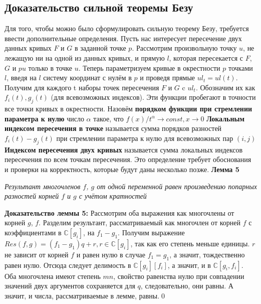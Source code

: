 \documentclass[a4paper, 12pt]{article}
\begin{document}
\pagebreak
\subsection{Доказательство сильной теоремы Безу}
Для того, чтобы можно было сформулировать сильную теорему Безу, требуется ввести дополнительные определения.\newline
Пусть нас интересует пересечение двух данных кривых $F$ и $G$ в заданной точке $p$. Рассмотрим произвольную точку $u$, не лежащую ни на одной из данных кривых, и прямую $l$, которая пересекается с $F$, $G$ и $pu$ только в точке $u$. Теперь параметризуем кривые в окрестности $p$ точками $l$, введя на $l$ систему координат с нулём в $p$ и проведя прямые $ul_t=ul(t)$. Получим для каждого t наборы точек пересечения $F$ и $G$ c $ul_t$. Обозначим их как $f_i(t), g_j(t)$ (для всевозможных индексов). Эти функции пробегают в точности все точки кривых в окрестности. \newline %
Назовём \textbf{порядком функции при стремлении параметра к нулю} число $\alpha$ такое, что $f(x)/t^\alpha \rightarrow const, x \rightarrow 0$\newline
\textbf{Локальным индексом пересечения в точке} называется сумма порядков разностей $f_i(t) - g_j(t)$ при стремлении параметра к нулю для всевозможных пар $(i,j)$\newline
\textbf{Индексом пересечения двух кривых} называется сумма локальных индексов пересечения по всем точкам пересечения.
\bigskip
Это определение требует обоснования и проверки на корректность, которые будут даны несколько позже.
\bigskip
\textbf{Лемма 5}

\textit{Результант многочленов $f$, $g$ от одной переменной равен произведению попарных разностей корней $f$ и $g$ с учётом кратностей}\newline

\textbf{Доказательство леммы 5:}\newline
Рассмотрим оба выражения как многочлены от корней $g$, $f$.\newline 
Разделим результант, рассматриваемый как многочлен от корней $f$ с коэффициентами в $\mathbb{C}[g_i]$, на $f_1 - g_1$. Получим выражение $Res(f,g) = (f_1 - g_1)q + r, r \in \mathbb{C}[g_i]$, так как его степень меньше единицы.
$r$ не зависит от корней $f$ и равен нулю в случае $f_1 = g_1$, а значит, тождественно равен нулю.\newline
Отсюда следует делимость в $\mathbb{C}[g_i][f_i]$, а значит, и в $\mathbb{C}[g_i, f_i]$. Оба многочлена имеют степень $mn$, свойство равенства нулю при совпадении значений двух аргументов сохраняется для $q$, следовательно, они равны. А значит, и числа, рассматриваемые в лемме, равны.\qed\newline
\end{document}
